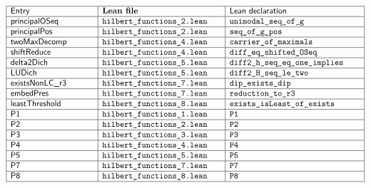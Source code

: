 \documentclass[11pt,reqno]{amsart}
\begin{document}
\begin{equation*}
\begin{array}{|m{3.5cm}|m{5cm}|m{5.5cm}|}
\hline
\text{\textsf{Entry}} & \text{\textbf{Lean file}} & \text{\textsf{Lean
declaration}} \\ \hline
\text{\textsf{principalOSeq}} & \text{\texttt{hilbert\_functions\_2.lean}} & 
\text{\texttt{unimodal\_seq\_of\_g}} \\ \hline
\text{\textsf{principalPos}} & \text{\texttt{hilbert\_functions\_2.lean}} & 
\text{\texttt{seq\_of\_g\_pos}} \\ \hline
\text{\textsf{twoMaxDecomp}} & \text{\texttt{hilbert\_functions\_4.lean}} & 
\text{\texttt{carrier\_of\_maximals}} \\ \hline
\text{\textsf{shiftReduce}} & \text{\texttt{hilbert\_functions\_4.lean}} & 
\text{\texttt{diff\_eq\_shifted\_OSeq}} \\ \hline
\text{\textsf{delta2Dich}} & \text{\texttt{hilbert\_functions\_5.lean}} & 
\text{\texttt{diff2\_h\_seq\_eq\_one\_implies}} \\ \hline
\text{\textsf{LUDich}} & \text{\texttt{hilbert\_functions\_5.lean}} & \text{%
\texttt{diff2\_H\_seq\_le\_two}} \\ \hline
\text{\textsf{existsNonLC\_r3}} & \text{\texttt{hilbert\_functions\_7.lean}}
& \text{\texttt{dip\_exists\_dip}} \\ \hline
\text{\textsf{embedPres}} & \text{\texttt{hilbert\_functions\_7.lean}} & 
\text{\texttt{reduction\_to\_r3}} \\ \hline
\text{\textsf{leastThreshold}} & \text{\texttt{hilbert\_functions\_8.lean}}
& \text{\texttt{exists\_isLeast\_of\_exists}} \\ \hline
\text{\textsf{P1}} & \text{\texttt{hilbert\_functions\_1.lean}} & \text{%
\texttt{P1}} \\ \hline
\text{\textsf{P2}} & \text{\texttt{hilbert\_functions\_2.lean}} & \text{%
\texttt{P2}} \\ \hline
\text{\textsf{P3}} & \text{\texttt{hilbert\_functions\_3.lean}} & \text{%
\texttt{P3}} \\ \hline
\text{\textsf{P4}} & \text{\texttt{hilbert\_functions\_4.lean}} & \text{%
\texttt{P4}} \\ \hline
\text{\textsf{P5}} & \text{\texttt{hilbert\_functions\_5.lean}} & \text{%
\texttt{P5}} \\ \hline
\text{\textsf{P7}} & \text{\texttt{hilbert\_functions\_7.lean}} & \text{%
\texttt{P7}} \\ \hline
\text{\textsf{P8}} & \text{\texttt{hilbert\_functions\_8.lean}} & \text{%
\texttt{P8}} \\ \hline
\end{array}%
\end{equation*}
\end{document}
